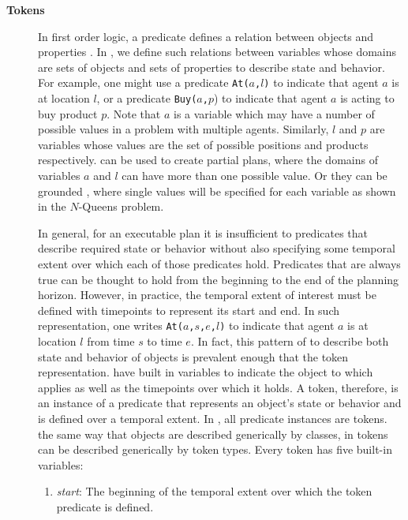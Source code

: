 \begin{description}
\item[\textbf{Tokens}] In first order logic, a predicate defines a
  relation between objects and properties \cite{gen87}.  In \eue, we
  define such relations between variables whose domains are sets of
  objects and sets of properties to describe state and behavior. For
  example, one might use a predicate \texttt{At($a$,$l$)} to indicate
  that agent $a$ is at location $l$, or a predicate
  \texttt{Buy($a$,$p$}) to indicate that agent $a$ is acting to buy
  product $p$. Note that $a$ is a variable which may have a number of
  possible values in a problem with multiple agents. Similarly, $l$
  and $p$ are variables whose values are the set of possible positions
  and products respectively. \eu can be used to create partial plans,
  where the domains of variables $a$ and $l$ can have more than one
  possible value. Or they can be grounded ,
  where single values will be specified for each variable as shown in
  the $N$-Queens problem.

  In general, for an executable plan it is insufficient to
   predicates that describe required state or
  behavior without also specifying some temporal extent over which
  each of those predicates hold. Predicates that are always true can
  be thought to hold from the beginning to the end of the planning
  horizon. However, in practice, the temporal extent of interest must
  be defined with timepoints to represent its start and end.  In such
   representation, one writes \texttt{At($a$,$s$,$e$,$l$)}
  to indicate that agent $a$ is at location $l$ from time $s$ to time
  $e$. In fact, this pattern of  to describe both
  state and behavior of objects is prevalent enough that \eu
   the token
  representation.  have built in variables to
  indicate the object to which  applies as well
  as the timepoints over which it holds. A token, therefore, is an
  instance of a predicate that represents an object's state or
  behavior and is defined over a temporal extent. In \eue, all
  predicate instances are tokens.  the same way that
  objects are described generically by classes, in \eu tokens can be
  described generically by token types. Every token has five built-in
  variables:

  \begin{enumerate}

  \item \textit {start}: The beginning of the temporal extent over
    which the token predicate is defined.


\end{enumerate}
\end{description}

